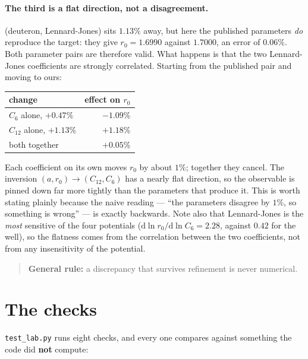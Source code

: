 \documentclass[11pt,a4paper]{article}
\begin{document}
\paragraph{The third is a flat direction, not a disagreement.}
(deuteron, Lennard-Jones) sits $1.13\%$ away, but here the published parameters
\emph{do} reproduce the target: they give $r_0 = 1.6990$ against $1.7000$, an
error of $0.06\%$. Both parameter pairs are therefore valid. What happens is
that the two Lennard-Jones coefficients are strongly correlated. Starting from
the published pair and moving to ours:

\begin{center}
\begin{tabular}{lr}
\toprule
change & effect on $r_0$ \\
\midrule
$C_6$ alone, $+0.47\%$ & $-1.09\%$ \\
$C_{12}$ alone, $+1.13\%$ & $+1.18\%$ \\
both together & $\mathbf{+0.05\%}$ \\
\bottomrule
\end{tabular}
\end{center}

\noindent
Each coefficient on its own moves $r_0$ by about $1\%$; together they cancel.
The inversion $(a, r_0) \to (C_{12}, C_6)$ has a nearly flat direction, so the
observable is pinned down far more tightly than the parameters that produce it.
This is worth stating plainly because the naive reading --- ``the parameters
disagree by $1\%$, so something is wrong'' --- is exactly backwards. Note also
that Lennard-Jones is the \emph{most} sensitive of the four potentials
($\mathrm{d}\ln r_0 / \mathrm{d}\ln C_6 = 2.28$, against $0.42$ for the well),
so the flatness comes from the correlation between the two coefficients, not
from any insensitivity of the potential.

\begin{quote}
\textbf{General rule:} a discrepancy that survives refinement is never numerical.
\end{quote}

\section{The checks}
\label{sec:checks}

\texttt{test\_lab.py} runs eight checks, and every one compares against
something the code did \textbf{not} compute:
\end{document}
